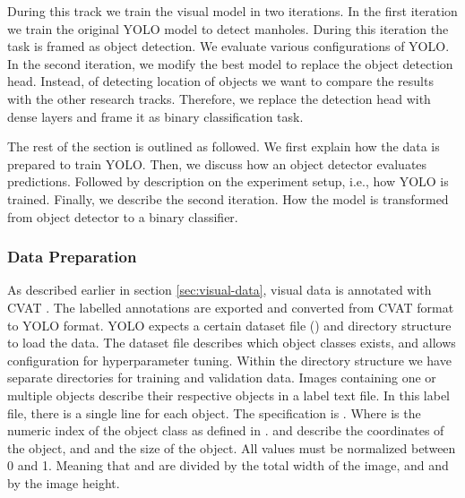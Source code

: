 During this track we train the visual model in two iterations. In the first iteration we train the original YOLO model to detect manholes. During this iteration the task is framed as object detection. We evaluate various configurations of YOLO. In the second iteration, we modify the best model to replace the object detection head. Instead, of detecting location of objects we want to compare the results with the other research tracks. Therefore, we replace the detection head with dense layers and frame it as binary classification task. 

The rest of the section is outlined as followed. We first explain how the data is prepared to train YOLO. Then, we discuss how an object detector evaluates predictions. Followed by description on the experiment setup, i.e., how YOLO is trained. Finally, we describe the second iteration. How the model is transformed from object detector to a binary classifier.



\subsubsection{Data Preparation}

As described earlier in section \ref{sec:visual-data}, visual data is annotated with CVAT \cite{cvat}. The labelled annotations are exported and converted from CVAT format to YOLO format. YOLO expects a certain dataset file () and directory structure to load the data. The dataset file describes which object classes exists, and allows configuration for hyperparameter tuning. Within the directory structure we have separate directories for training and validation data. Images containing one or multiple objects describe their respective objects in a label text file. In this label file, there is a single line for each object. The specification is . Where  is the numeric index of the object class as defined in .  and  describe the coordinates of the object, and  and  the size of the object. All values must be normalized between 0 and 1. Meaning that  and  are divided by the total width of the image, and  and  by the image height.

